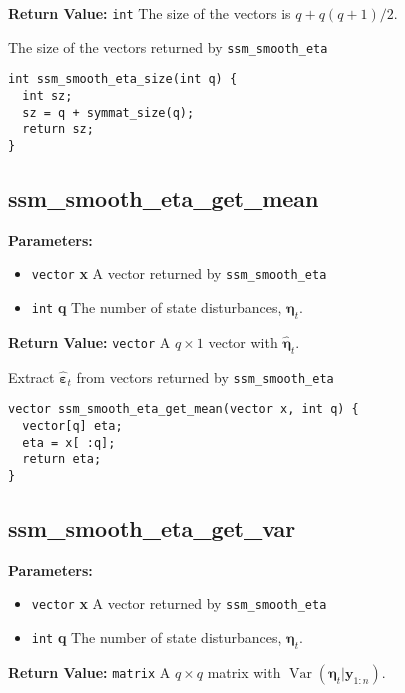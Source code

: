 \documentclass[]{book}
\providecommand{\tightlist}{%
  \setlength{\itemsep}{0pt}\setlength{\parskip}{0pt}}
\DeclareMathOperator{\Var}{Var}
\renewcommand{\vec}[1]{\boldsymbol{#1}}
\begin{document}
\textbf{Return Value:} \texttt{int} The size of the vectors is
\(q + q (q + 1) / 2\).

The size of the vectors returned by \texttt{ssm\_smooth\_eta}

\begin{verbatim}
int ssm_smooth_eta_size(int q) {
  int sz;
  sz = q + symmat_size(q);
  return sz;
}
\end{verbatim}

\subsection{ssm\_smooth\_eta\_get\_mean}\label{ssmux5fsmoothux5fetaux5fgetux5fmean}

\textbf{Parameters:}

\begin{itemize}
\tightlist
\item
  \texttt{vector} \textbf{x} A vector returned by
  \texttt{ssm\_smooth\_eta}
\item
  \texttt{int} \textbf{q} The number of state disturbances,
  \(\vec{\eta}_t\).
\end{itemize}

\textbf{Return Value:} \texttt{vector} A \(q \times 1\) vector with
\(\hat{\vec{\eta}}_t\).

Extract \(\hat{\vec{\varepsilon}}_t\) from vectors returned by
\texttt{ssm\_smooth\_eta}

\begin{verbatim}
vector ssm_smooth_eta_get_mean(vector x, int q) {
  vector[q] eta;
  eta = x[ :q];
  return eta;
}
\end{verbatim}

\subsection{ssm\_smooth\_eta\_get\_var}\label{ssmux5fsmoothux5fetaux5fgetux5fvar}

\textbf{Parameters:}

\begin{itemize}
\tightlist
\item
  \texttt{vector} \textbf{x} A vector returned by
  \texttt{ssm\_smooth\_eta}
\item
  \texttt{int} \textbf{q} The number of state disturbances,
  \(\vec{\eta}_t\).
\end{itemize}

\textbf{Return Value:} \texttt{matrix} A \(q \times q\) matrix with
\(\Var(\vec{\eta}_t | \vec{y}_{1:n})\).
\end{document}

